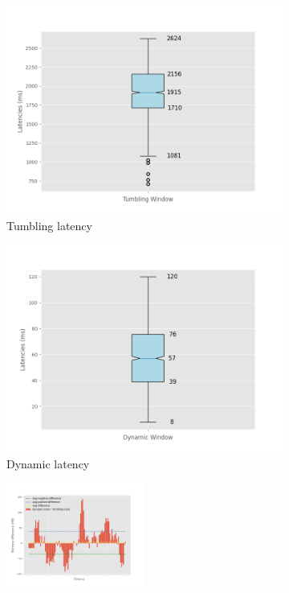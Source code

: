 \begin{figure}
\begin{subfigure}[b]{0.5\textwidth}
        \includegraphics[width=\textwidth]{fig/constant-rate/TumblingWindow_latency_boxplot.png}
        \caption{Tumbling latency}
        \label{fig:constant_tumb_boxplot}
    \end{subfigure}
    \hfill 
    \begin{subfigure}[b]{0.5\textwidth}
        \includegraphics[width=\textwidth]{fig/constant-rate/DynamicWindow_latency_boxplot.png}
        \caption{Dynamic latency}
        \label{fig:constant_dynamic_boxplot}
    \end{subfigure}
    \begin{subfigure}[b]{\textwidth}
        \centering
        \includegraphics[width=0.5\textwidth]{fig/constant-rate/mem_difference_bar.png}

\end{subfigure}
\end{figure}

